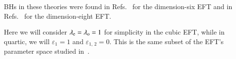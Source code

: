 \documentclass[twocolumn,prd,aps,superscriptaddress,preprintnumbers,tightenlines,showpacs,nofootinbib,amsfonts,amsmath,longbibliography]{revtex4-1}
\newcommand{\lame}{\lambda_{\rm e}}
\newcommand{\lamo}{\lambda_{\rm o}}
\begin{document}
BHs in these theories were found in Refs.~\cite{deRham:2020ejn,Cano:2020cao} for the dimension-six EFT
and in Refs.~\cite{Cardoso:2018ptl} for the dimension-eight EFT.

Here we will consider $\lame = \lamo = 1$ for simplicity in the cubic EFT, while in quartic,
we will $\varepsilon_{1} = 1$ and $\varepsilon_{1,\,2} = 0$. This is the same subset of the EFT's parameter
space studied in~\cite{Sennett:2019bpc}.


%
%
\end{document}
